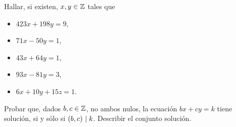 \begin{ejerDivisibilidad}
	Hallar, si existen, $x,y\in\mathbb{Z}$ tales que
	\begin{itemize}
		\item $423x+198y=9$,
		\item $71x-50y=1$,
		\item $43x+64y=1$,
		\item $93x-81y=3$,
		\item $6x+10y+15z=1$.
	\end{itemize}
\end{ejerDivisibilidad}

\begin{ejerDivisibilidad}
	Probar que, dados $b,c\in\mathbb{Z}$, no ambos nulos, la ecuaci\'on
	$bx+cy=k$ tiene soluci\'on, si y s\'olo si $\left({b,c}\right)_{}\mid k$.
	Describir el conjunto soluci\'on.%
\end{ejerDivisibilidad}


